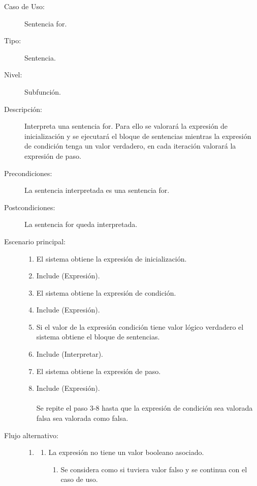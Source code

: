 \begin{framed}
\FloatBarrier
\begin{description}
   \item[Caso de Uso:]  Sentencia for.
   \item [Tipo:] Sentencia.
   \item[Nivel:]  Subfunción.
   \item[Descripción:] 
   Interpreta una sentencia for. Para ello se valorará la expresión 
   de inicialización y se ejecutará el bloque de sentencias 
   mientras la expresión de condición tenga un valor verdadero, en cada
   iteración valorará la expresión de paso.
   \item[Precondiciones:] 
   La sentencia interpretada es una sentencia for.
   \item[Postcondiciones:] 
      La sentencia for queda interpretada.
   \item[Escenario principal:] \hfill
   \begin{enumerate}
   \item El sistema obtiene la expresión de inicialización.
   \item Include (Expresión).
   \item El sistema obtiene la expresión de condición.
   \item Include (Expresión).
   \item Si el valor de la expresión condición tiene valor lógico verdadero el sistema obtiene el bloque de sentencias.
   \item Include (Interpretar). 
   \item El sistema obtiene la expresión de paso.
   \item Include (Expresión).\\\\ \hfill
      Se repite el paso 3-8 hasta que la expresión de condición sea valorada falsa 
      sea valorada como falsa.
   \end{enumerate}
   \item[Flujo alternativo:] \hfill 
   \begin{enumerate} \itemsep1pt \parskip0pt 
   \setcounter{enumi}{4}
   \renewcommand{\labelenumi}{}
   \renewcommand{\labelenumiii}{\arabic{enumiii}.}
   \renewcommand{\labelenumii}{\arabic{enumi}\alph{enumii}.}
      \item 
      \begin {enumerate}
         \setcounter{enumii}{0}
         \item La expresión no tiene un valor booleano asociado.
         \begin{enumerate}
         \item Se considera como si tuviera valor falso y se continua con el caso de uso.
         \end{enumerate}
      \end{enumerate}
   \end{enumerate}
\end{description}
 \FloatBarrier
\end{framed}
